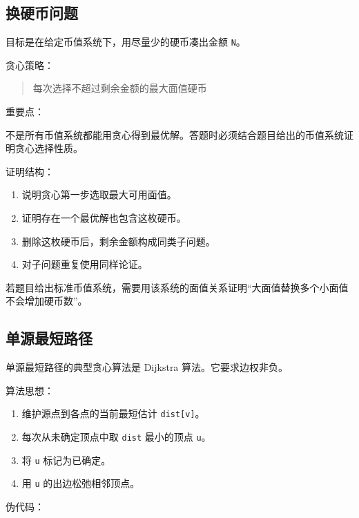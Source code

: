 \documentclass[UTF8,zihao=-4]{ctexart}
\begin{document}
\subsection*{换硬币问题}

目标是在给定币值系统下，用尽量少的硬币凑出金额 \texttt{N}。

贪心策略：

\begin{quote}
\small\ttfamily\raggedright
\relax 每次选择不超过剩余金额的最大面值硬币\\
\end{quote}

重要点：

不是所有币值系统都能用贪心得到最优解。答题时必须结合题目给出的币值系统证明贪心选择性质。

证明结构：

\begin{enumerate}
\item 说明贪心第一步选取最大可用面值。
\item 证明存在一个最优解也包含这枚硬币。
\item 删除这枚硬币后，剩余金额构成同类子问题。
\item 对子问题重复使用同样论证。
\end{enumerate}

若题目给出标准币值系统，需要用该系统的面值关系证明“大面值替换多个小面值不会增加硬币数”。

\subsection*{单源最短路径}

单源最短路径的典型贪心算法是 Dijkstra 算法。它要求边权非负。

算法思想：

\begin{enumerate}
\item 维护源点到各点的当前最短估计 \texttt{dist[v]}。
\item 每次从未确定顶点中取 \texttt{dist} 最小的顶点 \texttt{u}。
\item 将 \texttt{u} 标记为已确定。
\item 用 \texttt{u} 的出边松弛相邻顶点。
\end{enumerate}

伪代码：
\end{document}
